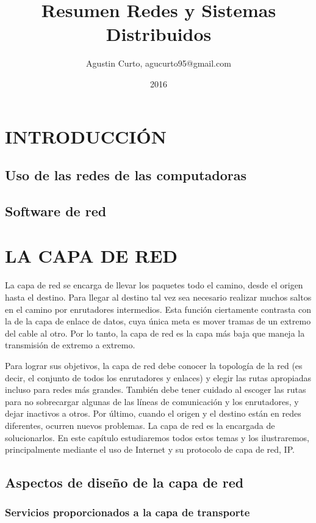 \documentclass[10pt,a4paper]{report}
\author{Agustin Curto, agucurto95@gmail.com}
\title{Resumen Redes y Sistemas Distribuidos}
\date{2016}
\begin{document}
\maketitle
\tableofcontents

\chapter{INTRODUCCIÓN}
\section{Uso de las redes de las computadoras}
\section{Software de red}



\chapter{LA CAPA DE RED}
La capa de red se encarga de llevar los paquetes todo el camino, desde el origen hasta el destino. Para llegar al destino tal vez sea necesario realizar muchos saltos en el camino por enrutadores intermedios. Esta función ciertamente contrasta con la de la capa de enlace de datos, cuya única meta es mover tramas de un extremo del cable al otro. Por lo tanto, la capa de red es la capa más baja que maneja la transmisión de extremo a extremo.
\par Para lograr sus objetivos, la capa de red debe conocer la topología de la red (es
decir, el conjunto de todos los enrutadores y enlaces) y elegir las rutas apropiadas
incluso para redes más grandes. También debe tener cuidado al escoger las rutas para
no sobrecargar algunas de las líneas de comunicación y los enrutadores, y dejar
inactivos a otros. Por último, cuando el origen y el destino están en redes diferentes, ocurren nuevos problemas. La capa de red es la encargada de solucionarlos. En este capítulo estudiaremos todos estos temas y los ilustraremos, principalmente mediante el uso de Internet y su protocolo de capa de red, IP.

\section{Aspectos de diseño de la capa de red}
\subsection{Servicios proporcionados a la capa de transporte}
\end{document}
